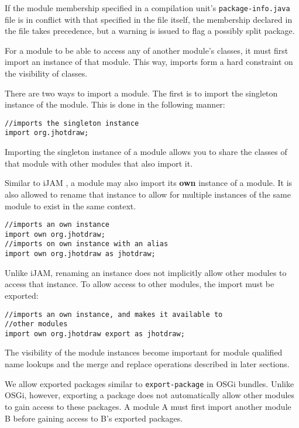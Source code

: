 If the module membership specified in a compilation unit's {\tt package-info.java}
file is in conflict with that specified in the file itself, the membership
declared in the file takes precedence, but a warning is issued to flag a possibly
split package.


For a module to be able to access any of another module's classes,
it must first import an instance of that module. This way, imports form
a hard constraint on the visibility of classes.

There are two ways to import a module. The first is to import the singleton
instance of the module. This is done in the following manner:

\begin{lstlisting}
//imports the singleton instance
import org.jhotdraw;
\end{lstlisting}

Importing the singleton instance of a module allows you to share the classes
of that module with other modules that also import it.

Similar to iJAM \cite{iJAM}, a module may also import its \textbf{own} instance of
a module. It is also allowed to rename that instance to allow for multiple
instances of the same module to exist in the same context.

\begin{lstlisting}
//imports an own instance
import own org.jhotdraw;
//imports on own instance with an alias
import own org.jhotdraw as jhotdraw;
\end{lstlisting}

Unlike iJAM, renaming an instance does not implicitly allow other
modules to access that instance. To allow access to other modules, the import
must be exported:

\begin{lstlisting}
//imports an own instance, and makes it available to
//other modules
import own org.jhotdraw export as jhotdraw;
\end{lstlisting}

The visibility of the module instances become important for module
qualified name lookups and the merge and replace operations described in later
sections.


We allow exported packages similar to {\tt export-package} in OSGi bundles. Unlike OSGi, however,
exporting a package does not automatically allow other modules to gain
access to these packages. A module A must first import another module B
before gaining access to B's exported packages.

